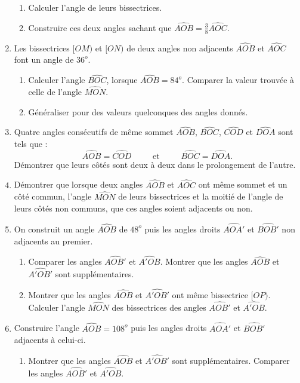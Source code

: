 \begin{enumerate}
\begin{enumerate}
\item Calculer l'angle de leurs bissectrices. 
\item Construire ces deux angles sachant que $\widehat{AOB}= \frac38\widehat{AOC}$.
\end{enumerate}
\item Les bissectrices $[OM)$ et $[ON)$ de deux angles non adjacents $\widehat{AOB}$ et $\widehat{AOC}$ font un angle de $36^o$. \begin{enumerate}
\item Calculer l'angle $\widehat{BOC}$, lorsque $\widehat{AOB}= 84^o$. Comparer la valeur trouvée à celle de l'angle $\widehat{MON}$. 
\item Généraliser pour des valeurs quelconques des angles donnés. 
\end{enumerate}
\item Quatre angles consécutifs de même sommet $\widehat{AOB}$, $\widehat{BOC}$, 
$\widehat{COD}$ et $\widehat{DOA}$ sont tels que : \[ \widehat{AOB}= \widehat{COD}
\phantom{meow}\text{et}\phantom{meow}\widehat{BOC}=\widehat{DOA}.\]
Démontrer que leurs côtés sont deux à deux dans le prolongement de l'autre. 
\item Démontrer que lorsque deux angles $\widehat{AOB}$ et $\widehat{AOC}$ ont même sommet et un côté commun, l'angle $\widehat{MON}$ de leurs bissectrices et la moitié de l'angle de leurs côtés non communs, que ces angles soient adjacents ou non. 
\item On construit un angle $\widehat{AOB}$ de $48^o$ puis les angles droits $\widehat{AOA'}$ et $\widehat{BOB'}$ non adjacents au premier. 
\begin{enumerate}
\item Comparer les angles $\widehat{AOB'}$ et $\widehat{A'OB}$. Montrer que les angles $\widehat{AOB}$ et $\widehat{A'OB'}$ sont supplémentaires. 
\item Montrer que les angles $\widehat{AOB}$ et $\widehat{A'OB'}$ ont même bissectrice $[OP)$. Calculer l'angle $\widehat{MON}$ des bissectrices des angles $\widehat{AOB'}$ et $\widehat{A'OB}$. 
\end{enumerate}
\item Construire l'angle $\widehat{AOB}=108^o$ puis les angles droits $\widehat{AOA'}$ et $\widehat{BOB'}$ adjacents à celui-ci. 
\begin{enumerate}
\item Montrer que les angles $\widehat{AOB}$ et $\widehat{A'OB'}$ sont supplémentaires. Comparer les angles $\widehat{AOB'}$ et $\widehat{A'OB}$. 

\end{enumerate}
\end{enumerate}

